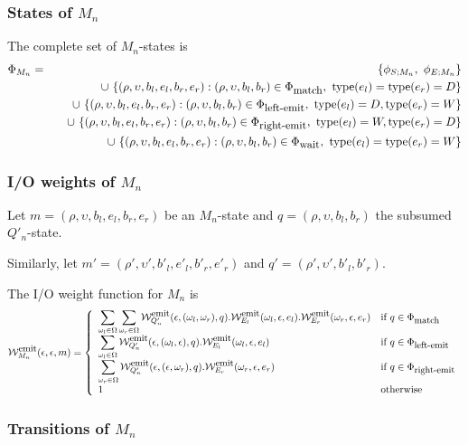 \documentclass{article}
\newcommand\States{\Phi}
\newcommand\statesof[1]{\States_{#1}}
\newcommand\startstateof[1]{\phi_{S;#1}}
\newcommand\laststateof[1]{\phi_{E;#1}}
\newcommand\weight{{\cal W}}
\newcommand\weightfunof[1]{\weight_{#1}}
\newcommand\emitweightfun[1]{\weightfunof{#1}^{\mbox{\small emit}}}
\newcommand\statetype{\mbox{type}}
\newcommand\stateset[1]{\statesof{\mbox{\small #1}}}
\newcommand\waitsuffix{wait}
\newcommand\waitstates{\stateset{\waitsuffix}}
\newcommand\mstate{(\rho,\upsilon,b_l,e_l,b_r,e_r)}
\newcommand\mstatedest{(\rho',\upsilon',b'_l,e'_l,b'_r,e'_r)}
\newcommand\qstate{(\rho,\upsilon,b_l,b_r)}
\newcommand\qstatedest{(\rho',\upsilon',b'_l,b'_r)}
\newcommand\matchsuffix{match}
\newcommand\leftemitsuffix{left-emit}
\newcommand\rightemitsuffix{right-emit}
\newcommand\matchstates{\stateset{\matchsuffix}}
\newcommand\leftemitstates{\stateset{\leftemitsuffix}}
\newcommand\rightemitstates{\stateset{\rightemitsuffix}}
\begin{document}
\subsubsection{States of $M_n$}
The complete set of $M_n$-states is
\begin{eqnarray*}
\statesof{M_n} & = & \{ \startstateof{M_n},\ \laststateof{M_n} \} \\
& & \quad \cup\ \{ \mstate: \qstate \in \matchstates,\ \statetype(e_l)=\statetype(e_r)=D \} \\
& & \quad \cup\ \{ \mstate: \qstate \in \leftemitstates,\ \statetype(e_l)=D, \statetype(e_r)=W \} \\
& & \quad \cup\ \{ \mstate: \qstate \in \rightemitstates,\ \statetype(e_l)=W, \statetype(e_r)=D \} \\
& & \quad \cup\ \{ \mstate: \qstate \in \waitstates,\ \statetype(e_l)=\statetype(e_r)=W \}
\end{eqnarray*}

\subsubsection{I/O weights of $M_n$}
Let $m = \mstate$ be an $M_n$-state and $q = \qstate$ the subsumed $Q'_n$-state.

Similarly, let $m' = \mstatedest$ and $q' = \qstatedest$.

The I/O weight function for $M_n$ is
\[
\emitweightfun{M_n}(\epsilon,\epsilon,m) = \left\{
\begin{array}{ll}
\displaystyle
\sum_{\omega_l \in \Omega}
\sum_{\omega_r \in \Omega}
 \emitweightfun{Q'_n}(\epsilon,(\omega_l,\omega_r),q)
. \emitweightfun{E_l}(\omega_l,\epsilon,e_l)
. \emitweightfun{E_r}(\omega_r,\epsilon,e_r)
 & \mbox{if $q \in \matchstates$} \\
\displaystyle
\sum_{\omega_l \in \Omega}
 \emitweightfun{Q'_n}(\epsilon,(\omega_l,\epsilon),q)
. \emitweightfun{E_l}(\omega_l,\epsilon,e_l)
 & \mbox{if $q \in \leftemitstates$} \\
\displaystyle
\sum_{\omega_r \in \Omega}
 \emitweightfun{Q'_n}(\epsilon,(\epsilon,\omega_r),q)
. \emitweightfun{E_r}(\omega_r,\epsilon,e_r)
 & \mbox{if $q \in \rightemitstates$} \\
1
 & \mbox{otherwise}
\end{array}
\right.
\]

\subsubsection{Transitions of $M_n$}
\end{document}
